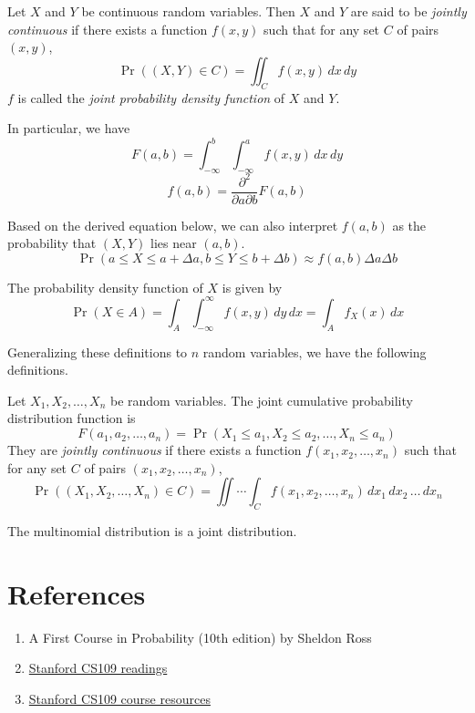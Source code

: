 \documentclass{article}
\begin{document}
\begin{definition}
  Let $X$ and $Y$ be continuous random variables.
  Then $X$ and $Y$ are said to be \emph{jointly continuous} if there exists a function $f(x, y)$ such that for any set $C$ of pairs $(x, y)$,
  \[
    \Pr((X, Y) \in C) = \iint_C f(x, y) \, dx \, dy
  \]
  $f$ is called the \emph{joint probability density function} of $X$ and $Y$.
\end{definition}

\begin{remark}
  In particular, we have
  \[
    F(a, b) = \int_{-\infty}^b \int_{-\infty}^a f(x, y) \, dx \, dy
  \]
  \[
    f(a, b) = \frac{\partial^2}{\partial a \partial b} F(a, b)
  \]
\end{remark}

\begin{remark}
  Based on the derived equation below, we can also interpret $f(a, b)$ as the probability that $(X, Y)$ lies near $(a, b)$.
  \[
    \Pr(a \leq X \leq a + \Delta a, b \leq Y \leq b + \Delta b) \approx f(a, b) \Delta a \Delta b
  \]
\end{remark}

\begin{remark}
  The probability density function of $X$ is given by
  \[
    \Pr(X \in A) = \int_A \int_{-\infty}^\infty f(x, y) \, dy \, dx = \int_A f_X(x) \, dx
  \]
\end{remark}

Generalizing these definitions to $n$ random variables, we have the following definitions.

\begin{definition}
  Let $X_1, X_2, \ldots, X_n$ be random variables.
  The joint cumulative probability distribution function is
  \[
    F(a_1, a_2, \ldots, a_n) = \Pr(X_1 \leq a_1, X_2 \leq a_2, \ldots, X_n \leq a_n)
  \]
  They are \emph{jointly continuous} if there exists a function $f(x_1, x_2, \ldots, x_n)$ such that for any set $C$ of pairs $(x_1, x_2, \ldots, x_n)$,
  \[
    \Pr((X_1, X_2, \ldots, X_n) \in C) = \iint \cdots \int_C f(x_1, x_2, \ldots, x_n) \, dx_1 \, dx_2 \, \ldots \, dx_n
  \]
\end{definition}

\begin{example}
  The multinomial distribution is a joint distribution.
\end{example}

\section{References}

\begin{enumerate}
  \item A First Course in Probability (10th edition) by Sheldon Ross
  \item \href{https://chrispiech.github.io/probabilityForComputerScientists/en/}{Stanford CS109 readings}
  \item \href{https://web.stanford.edu/class/archive/cs/cs109/cs109.1234/}{Stanford CS109 course resources}
\end{enumerate}
\end{document}
